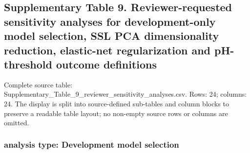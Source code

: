 \documentclass[utf8]{frontiers_suppmat}
\begin{document}
\clearpage

\subsection*{Supplementary Table 9. Reviewer-requested sensitivity analyses for development-only model selection, SSL PCA dimensionality reduction, elastic-net regularization and pH-threshold outcome definitions}

Complete source table: Supplementary\_\allowbreak{}Table\_\allowbreak{}9\_\allowbreak{}reviewer\_\allowbreak{}sensitivity\_\allowbreak{}analyses.\allowbreak{}csv. Rows: 24; columns: 24. The display is split into source-defined sub-tables and column blocks to preserve a readable table layout; no non-empty source rows or columns are omitted.

\subsubsection*{analysis type: Development model selection}
\end{document}
